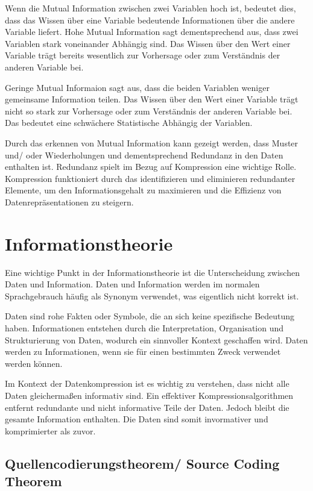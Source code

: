 \documentclass[conference]{IEEEtran}
\begin{document}
Wenn die Mutual Information zwischen zwei Variablen hoch ist, bedeutet dies,
dass das Wissen über eine Variable
bedeutende Informationen über die andere Variable liefert.
Hohe Mutual Information sagt dementsprechend aus, dass zwei Variablen stark voneinander
Abhängig sind.
Das Wissen über den Wert einer Variable trägt bereits wesentlich zur Vorhersage
oder zum Verständnis der anderen Variable bei.

Geringe Mutual Informaion sagt aus, dass die beiden Variablen weniger gemeinsame
Information teilen.
Das Wissen über den Wert einer Variable trägt nicht so stark zur
Vorhersage oder zum Verständnis der anderen Variable bei.
Das bedeutet eine schwächere Statistische Abhängig der Variablen.

Durch das erkennen von Mutual Information kann gezeigt werden, dass Muster und/ oder
Wiederholungen und dementsprechend Redundanz in den Daten enthalten ist.
Redundanz spielt im Bezug auf Kompression eine wichtige Rolle.
Kompression funktioniert durch das identifizieren und eliminieren redundanter Elemente,
um den Informationsgehalt zu maximieren und die Effizienz von Datenrepräsentationen
zu steigern.


\section{Informationstheorie}

Eine wichtige Punkt in der Informationstheorie ist die Unterscheidung
zwischen Daten und Information.
Daten und Information werden im normalen Sprachgebrauch häufig als Synonym verwendet,
was eigentlich nicht korrekt ist.

Daten sind rohe Fakten oder Symbole, die an sich keine spezifische Bedeutung haben.
Informationen entstehen durch die Interpretation, Organisation und Strukturierung
von Daten, wodurch ein sinnvoller Kontext geschaffen wird. \cite{pieper}
Daten werden zu Informationen, wenn sie für einen bestimmten Zweck verwendet werden können.

Im Kontext der Datenkompression ist es wichtig zu verstehen, dass nicht alle Daten
gleichermaßen informativ sind.
Ein effektiver Kompressionsalgorithmen entfernt redundante
und nicht informative Teile der Daten.
Jedoch bleibt die gesamte Information enthalten.
Die Daten sind somit invormativer und komprimierter als zuvor.

\subsection{Quellencodierungstheorem/ Source Coding Theorem}
\end{document}
